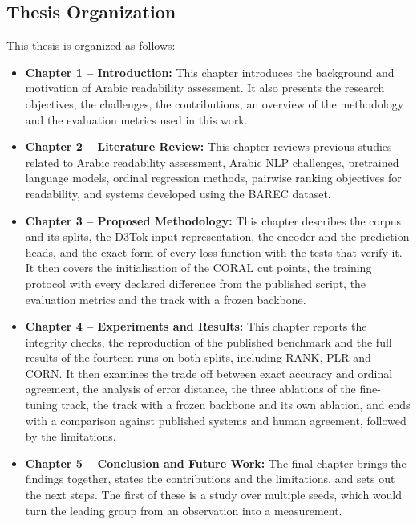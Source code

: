\subsection{Thesis Organization}

This thesis is organized as follows:

\vspace{0.3cm}

\begin{itemize}

\item \textbf{Chapter 1 -- Introduction:}
This chapter introduces the background and motivation of Arabic readability assessment. It also presents the research objectives, the challenges, the contributions, an overview of the methodology and the evaluation metrics used in this work.

\vspace{0.2cm}

\item \textbf{Chapter 2 -- Literature Review:}
This chapter reviews previous studies related to Arabic readability assessment, Arabic NLP challenges, pretrained language models, ordinal regression methods, pairwise ranking objectives for readability, and systems developed using the BAREC dataset.

\vspace{0.2cm}

\item \textbf{Chapter 3 -- Proposed Methodology:}
This chapter describes the corpus and its splits, the D3Tok input representation, the encoder and the prediction heads, and the exact form of every loss function with the tests that verify it. It then covers the initialisation of the CORAL cut points, the training protocol with every declared difference from the published script, the evaluation metrics and the track with a frozen backbone.
\vspace{0.2cm}

\item \textbf{Chapter 4 -- Experiments and Results:}
This chapter reports the integrity checks, the reproduction of the published benchmark and the full results of the fourteen runs on both splits, including RANK, PLR and CORN. It then examines the trade off between exact accuracy and ordinal agreement, the analysis of error distance, the three ablations of the fine-tuning track, the track with a frozen backbone and its own ablation, and ends with a comparison against published systems and human agreement, followed by the limitations.

\vspace{0.2cm}

\item \textbf{Chapter 5 -- Conclusion and Future Work:}
The final chapter brings the findings together, states the contributions and the limitations, and sets out the next steps. The first of these is a study over multiple seeds, which would turn the leading group from an observation into a measurement.
\end{itemize}

